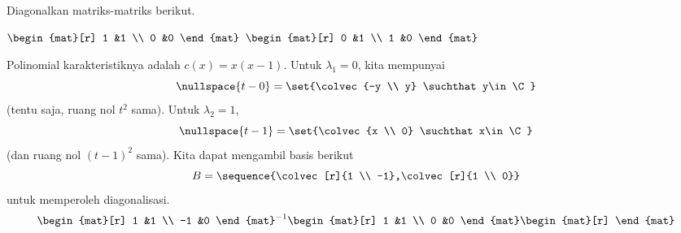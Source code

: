 \begin{exercises}
\begin{answer}
\begin{equation*}
     \end{equation*}  
    \end{answer}
  \recommended \item Diagonalkan matriks-matriks berikut.
    \begin{exparts*}
       \partsitem \( \begin{mat}[r]
                  1  &1  \\
                  0  &0
                \end{mat}  \)
       \partsitem \( \begin{mat}[r]
                  0  &1  \\
                  1  &0
                \end{mat}  \)
    \end{exparts*}
    \begin{answer}
      \begin{exparts}
        \partsitem Polinomial karakteristiknya adalah \( c(x)=x(x-1) \).
          Untuk $\lambda_1=0$, kita mempunyai
          \begin{equation*}
            \nullspace{t-0}=\set{\colvec{-y \\ y}
                                 \suchthat y\in\C }  
          \end{equation*} 
          (tentu saja, ruang nol $t^2$ sama).
          Untuk $\lambda_2=1$,
          \begin{equation*}
            \nullspace{t-1}=\set{\colvec{x \\ 0}
                                     \suchthat x\in\C }  
          \end{equation*}
          (dan ruang nol $(t-1)^2$ sama).
          Kita dapat mengambil basis berikut
          \begin{equation*}
            B=\sequence{\colvec[r]{1 \\ -1},\colvec[r]{1 \\ 0}}
          \end{equation*}
          untuk memperoleh diagonalisasi.
          \begin{equation*}
            \begin{mat}[r]
              1  &1  \\
             -1  &0
            \end{mat}^{-1}
            \begin{mat}[r]
              1  &1  \\
              0  &0
            \end{mat}
            \begin{mat}[r]

\end{mat}
\end{equation*}
\end{exparts}
\end{answer}
\end{exercises}
